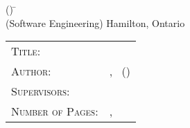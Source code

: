 \begin{tabbing}
	\textsc{\DegreeName} (\MonthYearOfSubmission) \hspace{3cm}	\= \UniversityName		\\
	(Software Engineering)			 	\> Hamilton, Ontario	\\[1cm]
\end{tabbing}

\noindent\begin{tabular}{l p{}}
	\textsc{Title:} 		& \ThesisTitle 						\\[.6cm]
	\textsc{Author:} 		& \Author, \PastDegrees ~(\PastUniversity) 		\\[.6cm]
	\textsc{Supervisors:} 	& \Supervisors			 			\\[.6cm]
	\textsc{Number of Pages:} & \pageref{ContentStart}, \pageref{ContentEnd} 	\\[.6cm]
\end{tabular}